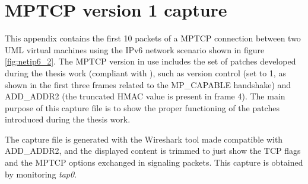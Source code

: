 \chapter{MPTCP version 1 capture}
\label{app:b}

This appendix contains the first 10 packets of a MPTCP connection between two UML virtual machines using the IPv6 network scenario shown in figure \ref{fig:netip6_2}. The MPTCP version in use includes the set of patches developed during the thesis work (compliant with ), such as version control (set to 1, as shown in the first three frames related to the MP\_CAPABLE handshake) and ADD\_ADDR2 (the truncated HMAC value is present in frame 4). The main purpose of this capture file is to show the proper functioning of the patches introduced during the thesis work.

The capture file is generated with the Wireshark tool made compatible with ADD\_ADDR2, and the displayed content is trimmed to just show the TCP flags and the MPTCP options exchanged in signaling packets. This capture is obtained by monitoring \textit{tap0}.

